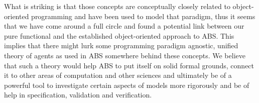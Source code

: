 %
%

What is striking is that those concepts are conceptually closely related to object-oriented programming and have been used to model that paradigm, thus it seems that we have come around a full circle and found a potential link between our pure functional and the established object-oriented approach to ABS. This implies that there might lurk some programming paradigm agnostic, unified theory of agents as used in ABS somewhere behind these concepts. We believe that such a theory would help ABS to put itself on solid formal grounds, connect it to other areas of computation and other sciences and ultimately be of a powerful tool to investigate certain aspects of models more rigorously and be of help in specification, validation and verification.